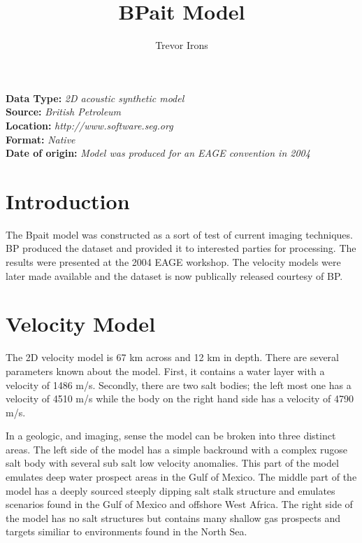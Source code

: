 \title{BPait Model}
\author{Trevor Irons}
\maketitle
\lstset{language=python,numbers=left,numberstyle=\tiny,showstringspaces=false}

\noindent
\textbf {Data Type:} \emph{2D acoustic synthetic model}\\
\textbf {Source:} \emph{British Petroleum}\\
\textbf {Location:} \emph{http://www.software.seg.org}\\
\textbf {Format:} \emph{Native} \\
\textbf{Date of origin:} \emph{Model was produced for an EAGE convention in 2004}\\

\section{Introduction}
The Bpait model was constructed as a sort of test of current imaging techniques.  BP produced the dataset and provided it to interested parties for processing.  The results were presented at the 2004 EAGE workshop.  The velocity models were later made available and the dataset is now publically released courtesy of BP.  

{
\tiny

\normalsize
}

\section{Velocity Model}
The 2D velocity model is 67 km across and 12 km in depth. There are several parameters known about the model.  
First, it contains a water layer with a velocity of 1486 m/s.  Secondly, there are two salt bodies; 
the left most one has a velocity of 4510 m/s while the body on the right hand side has a velocity of 4790 m/s.  

In a geologic, and imaging, sense the model can be broken into three distinct areas.  
The left side of the model has a simple backround with a complex rugose salt body with several sub salt 
low velocity anomalies.  This part of the model emulates deep water prospect areas in the Gulf of Mexico.  The middle part of the model has a deeply sourced steeply dipping salt stalk structure and emulates scenarios found in the Gulf of Mexico and offshore West Africa.  The right side of the model has no salt structures but contains many shallow gas prospects and targets similiar to environments found in the North Sea.        

